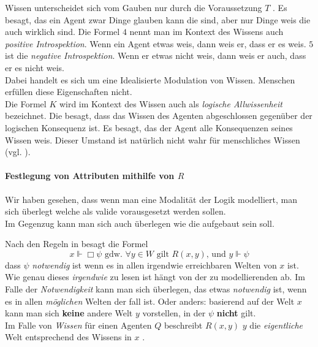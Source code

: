 Wissen unterscheidet sich vom Gauben nur durch die Voraussetzung $T$ \TFormel.
Es besagt, das ein Agent zwar Dinge glauben kann die \false sind, aber nur Dinge weis die auch wirklich \true sind.
Die Formel $4$ \vierFormel nennt man im Kontext des Wissens auch \emph{positive Introspektion}. 
Wenn ein Agent etwas weis, dann weis er, dass er es weis.
$5$ \fuenfFormel ist die \emph{negative Introspektion}. Wenn er etwas nicht weis, dann weis er auch, dass er es nicht weis.\\
Dabei handelt es sich um eine Idealisierte Modulation von Wissen.
Menschen erfüllen diese Eigenschaften nicht.\\
Die Formel $K$ \KFormel wird im Kontext des Wissen auch als \emph{logische Allwissenheit} bezeichnet.
Die besagt, dass das Wissen des Agenten abgeschlossen gegenüber der logischen Konsequenz ist.
Es besagt, das der Agent alle Konsequenzen seines Wissen weis. Dieser Umstand ist natürlich nicht wahr für menschliches Wissen (vgl. \cite[S.319f]{huth2004logic}).


\paragraph{Festlegung von Attributen mithilfe von $R$}
\label{festlegung_von_attibuten_mit_R}

Wir haben gesehen, dass wenn man eine Modalität der Logik modelliert, man sich überlegt welche \formelSchemata als valide vorausgesetzt werden sollen.\\
Im Gegenzug kann man sich auch überlegen wie die \KS aufgebaut sein soll.

Nach den Regeln in  besagt die Formel
\begin{equation*}
	x \Vdash \Box \psi \text{ gdw. }\forall y \in W \text{ gilt } R(x,y)\text{, und } y \Vdash \psi	
\end{equation*}
dass $\psi$ \emph{notwendig} ist wenn es in allen irgendwie erreichbaren Welten von $x$ \true ist.\\
Wie genau dieses \emph{irgendwie} zu lesen ist hängt von der zu modellierenden \ML ab.
Im Falle der \emph{Notwendigkeit} kann man sich überlegen, das etwas \emph{notwendig} ist, wenn es in allen \emph{möglichen} Welten der fall ist.
Oder anders: basierend auf der Welt $x$ kann man sich \textbf{keine} andere Welt $y$ vorstellen, in der $\psi$ \textbf{nicht} gilt.\\
Im Falle von \emph{Wissen} für einen Agenten $Q$ beschreibt $R(x,y)$ $y$ die \emph{eigentliche} Welt entsprechend des Wissens in $x$ .

